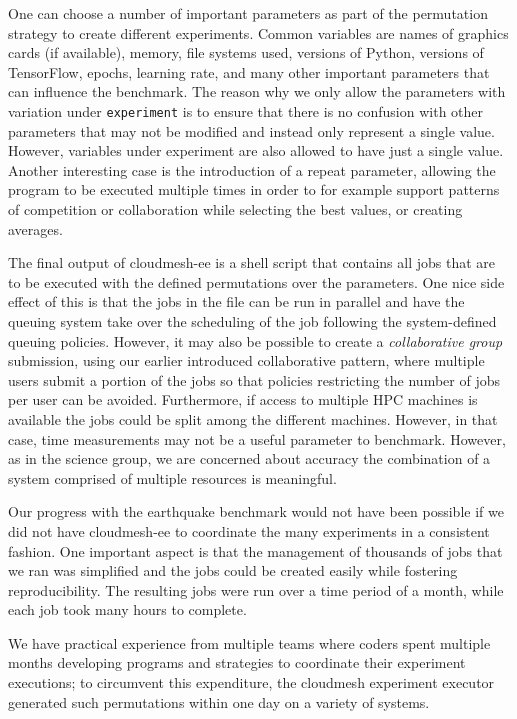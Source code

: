 One can choose a number of important parameters as part of the permutation strategy to create different experiments. Common variables are names of graphics cards (if available), memory, file systems used, versions of Python, versions of TensorFlow, epochs, learning rate, and many other important parameters that can influence the benchmark.  The reason why we only allow the parameters with variation under \verb|experiment| is to ensure that there is no confusion with other parameters that may not be modified and instead only represent a single value. However, variables under experiment are also allowed to have just a single value.  Another interesting case is the introduction of a repeat parameter, allowing the program to be executed multiple times in order to for example support patterns of competition or collaboration while selecting the best values, or creating averages.


The final output of cloudmesh-ee is a shell script that contains all jobs that are to be executed with the defined permutations over the parameters. One nice side effect of this is that the jobs in the file can be run in parallel and have the queuing system take over the scheduling of the job following the system-defined queuing policies. However, it may also be possible to create a {\it collaborative group} submission, using our earlier introduced collaborative pattern, where multiple users submit a portion of the jobs so that policies restricting the number of jobs per user can be avoided. Furthermore, if access to multiple HPC machines is available the jobs could be split among the different machines. However, in that case, time measurements may not be a useful parameter to benchmark. However, as in the science group, we are concerned about accuracy the combination of a system comprised of multiple resources is meaningful.

Our progress with the earthquake benchmark would not have been possible if we did not have cloudmesh-ee to coordinate the many experiments in a consistent fashion. One important aspect is that the management of thousands of jobs that we ran was simplified and the jobs could be created easily while fostering reproducibility. The resulting jobs were run over a time period of a month, while each job took many hours to complete.

We have practical experience from multiple teams where coders spent multiple months developing programs and strategies to coordinate their experiment executions; to circumvent this expenditure, the cloudmesh experiment executor generated such permutations within one day on a variety of systems.

